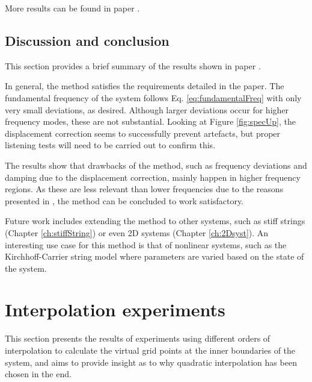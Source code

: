 More results can be found in paper \citeP[G]. 




\subsection{Discussion and conclusion}\label{sec:conclusion}
This section provides a brief summary of the results shown in paper \citeP[G]. 

In general, the method satisfies the requirements detailed in the paper. The fundamental frequency of the system follows Eq. \eqref{eq:fundamentalFreq} with only very small deviations, as desired. Although larger deviations occur for higher frequency modes, these are not substantial. Looking at Figure \ref{fig:specUp}, the displacement correction seems to successfully prevent artefacts, but proper listening tests will need to be carried out to confirm this.

The results show that drawbacks of the method, such as frequency deviations and damping due to the displacement correction, mainly happen in higher frequency regions. As these are less relevant than lower frequencies due to the reasons presented in \citeP[G], the method can be concluded to work satisfactory. 

Future work includes extending the method to other systems, such as stiff strings (Chapter \ref{ch:stiffString}) or even 2D systems (Chapter \ref{ch:2Dsyst}). An interesting use case for this method is that of nonlinear systems, such as the Kirchhoff-Carrier string model \cite{Carrier1945} where parameters are varied based on the state of the system. 

\section{Interpolation experiments}\label{sec:iterations}
This section presents the results of experiments using different orders of interpolation to calculate the virtual grid points at the inner boundaries of the system, and aims to provide insight as to why quadratic interpolation has been chosen in the end. 

